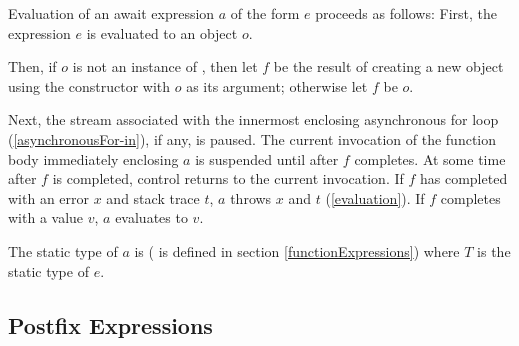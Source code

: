 \documentclass[makeidx]{article}
\begin{document}
\LMHash{}%
Evaluation of an await expression $a$ of the form \AWAIT{} $e$ proceeds as follows:
First, the expression $e$ is evaluated to an object $o$.

\LMHash{}%
Then, if $o$ is not an instance of , then let $f$ be the result of creating a new object using the constructor  with $o$ as its argument; otherwise let $f$ be $o$.

\LMHash{}%
Next, the stream associated with the innermost enclosing asynchronous for loop (\ref{asynchronousFor-in}), if any, is paused.
The current invocation of the function body immediately enclosing $a$ is suspended until after $f$ completes.
At some time after $f$ is completed, control returns to the current invocation.
If $f$ has completed with an error $x$ and stack trace $t$, $a$ throws $x$ and $t$ (\ref{evaluation}).
If $f$ completes with a value $v$, $a$ evaluates to $v$.





\LMHash{}%
The static type of $a$ is  (\flatten{} is defined in section \ref{functionExpressions}) where $T$ is the static type of $e$.


\subsection{Postfix Expressions}
\end{document}
